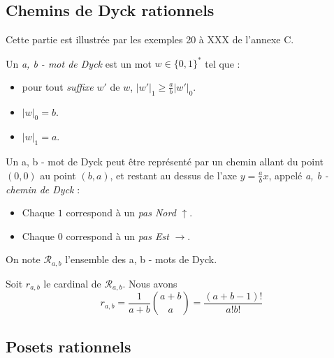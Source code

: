 \subsection{Chemins de Dyck rationnels}

Cette partie est illustrée par les exemples 20 à XXX de l'annexe C.

\begin{definition}
    Un \emph{a, b - mot de Dyck} est un mot $w \in \{0,1\}^*$ tel que :
    \begin{itemize}
        \item pour tout \emph{suffixe} $w'$ de $w$,
            $\displaystyle |w'|_1 \geqslant \frac{a}{b}|w'|_0$.
        \item $|w|_0 = b$.
        \item $|w|_1 = a$.
    \end{itemize}
\end{definition}

Un a, b - mot de Dyck peut être représenté par un chemin allant du point
$(0,0)$ au point $(b,a)$, et restant au dessus de l'axe $y = \frac{a}{b}x$,
appelé \emph{a, b - chemin de Dyck} :
\begin{itemize}
    \item Chaque $1$ correspond à un \emph{pas Nord} $\uparrow$. 
    \item Chaque $0$ correspond à un \emph{pas Est} $\rightarrow$.
\end{itemize}

On note $\mathcal{R}_{a, b}$ l'ensemble des a, b - mots de Dyck.

\begin{theorem}[Bizley, 1954]
    Soit $r_{a,b}$ le cardinal de $\mathcal{R}_{a,b}$.
    Nous avons $$r_{a,b} = \frac{1}{a+b} \binom {a+b}{a} =
    \frac{(a+b-1)!}{a!b!}$$
\end{theorem}

\subsection{Posets rationnels}
